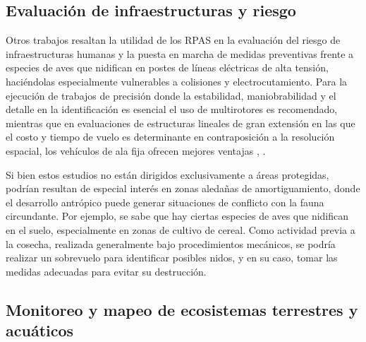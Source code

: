 \documentclass[twocolumn]{extarticle}
\begin{document}
\subsection{Evaluación de infraestructuras y
riesgo}\label{evaluacion-de-infraestructuras-y-riesgo}

Otros trabajos resaltan la utilidad de los RPAS en la evaluación del
riesgo de infraestructuras humanas y la puesta en marcha de medidas
preventivas frente a especies de aves que nidifican en postes de líneas
eléctricas de alta tensión, haciéndolas especialmente vulnerables a
colisiones y electrocutamiento. Para la ejecución de trabajos de
precisión donde la estabilidad, maniobrabilidad y el detalle en la
identificación es esencial \citep{Lobermeier2015} el uso de multirotores
es recomendado, mientras que en evaluaciones de estructuras lineales de
gran extensión en las que el costo y tiempo de vuelo es determinante en
contraposición a la resolución espacial, los vehículos de ala fija
ofrecen mejores ventajas \citep{Mulero-Pazmany2014a}, \citep{Zhang2016}.

Si bien estos estudios no están dirigidos exclusivamente a áreas
protegidas, podrían resultan de especial interés en zonas aledañas de
amortiguamiento, donde el desarrollo antrópico puede generar situaciones
de conflicto con la fauna circundante. Por ejemplo, se sabe que hay
ciertas especies de aves que nidifican en el suelo, especialmente en
zonas de cultivo de cereal. Como actividad previa a la cosecha,
realizada generalmente bajo procedimientos mecánicos, se podría realizar
un sobrevuelo para identificar posibles nidos, y en su caso, tomar las
medidas adecuadas para evitar su destrucción.

\subsection{Monitoreo y mapeo de ecosistemas terrestres y
acuáticos}\label{monitoreo-y-mapeo-de-ecosistemas-terrestres-y-acuaticos}
\end{document}
